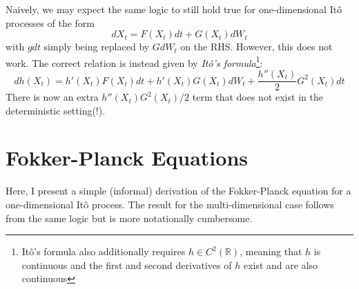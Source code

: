 Naively, we may expect the same logic to still hold true for one-dimensional It\^o processes of the form
\begin{equation*}
	dX_t = F(X_t)dt + G(X_t)dW_t
\end{equation*}
with $gdt$ simply being replaced by $GdW_t$ on the RHS. However, this does not work. The correct relation is instead given by 
\emph{It\^o's formula}\footnote{It\^o's formula also additionally requires $h \in C^2(\mathbb{R})$, meaning that $h$ is continuous and the first and second derivatives of $h$ exist and are also continuous}:
\begin{equation*}
	dh(X_t) = h'(X_t)F(X_t)dt + h'(X_t)G(X_t)dW_t  + \frac{h''(X_t)}{2}G^2(X_t)dt 
\end{equation*}
There is now an extra $h''(X_t)G^2(X_t)/2$ term that does not exist in the deterministic setting(!). 

\section{Fokker-Planck Equations}

Here, I present a simple (informal) derivation of the Fokker-Planck equation for a one-dimensional It\^{o} process. The result for the multi-dimensional case follows from the same logic but is more notationally cumbersome.

